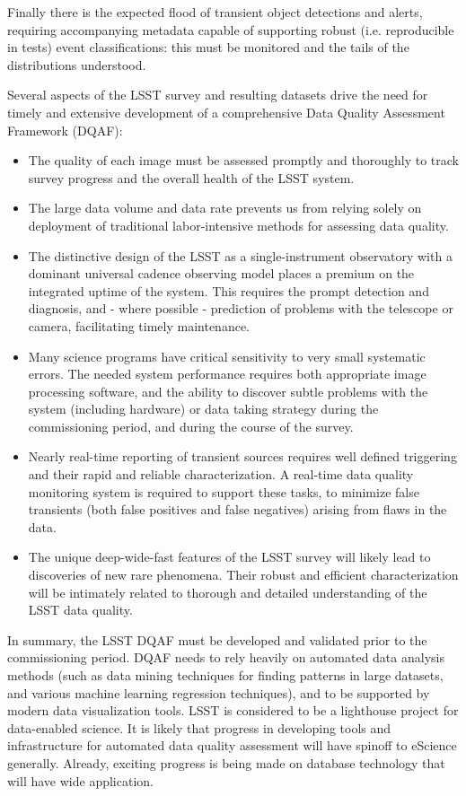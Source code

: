 \documentclass[SE,toc,lsstdraft]{lsstdoc}
\begin{document}
Finally there is the expected flood of transient object detections and alerts, requiring accompanying metadata capable of supporting robust (i.e. reproducible in tests) event classifications: this must be monitored and the tails of the distributions understood.

Several aspects of the LSST survey and resulting datasets drive the need for timely and
extensive development of a comprehensive Data Quality Assessment Framework (DQAF):
\begin{itemize}
\item The quality of each image must be assessed promptly and thoroughly to track
         survey progress and the overall health of the LSST system.
\item The large data volume and data rate prevents us from relying solely on deployment of traditional
         labor-intensive methods for assessing data quality.
\item The distinctive design of the LSST as a single-instrument observatory with a dominant universal cadence observing     model places a premium on the integrated uptime of the system.  This requires the prompt detection and diagnosis, and - where possible - prediction of problems with the telescope or camera, facilitating timely maintenance.
\item Many science programs have critical sensitivity to very small systematic errors. The needed system
          performance requires both appropriate image processing software, and the ability
          to discover subtle problems with the system (including hardware) or data taking strategy during the
         commissioning period, and during the course of the survey.
\item Nearly real-time reporting of transient sources requires well defined triggering and their
          rapid and reliable characterization. A real-time data quality monitoring system is required to
          support these tasks, to minimize false transients (both false positives and false negatives) arising from flaws in the data.
\item The unique deep-wide-fast features of the LSST survey will likely lead to discoveries of
          new rare phenomena.  Their robust and efficient characterization will be intimately
          related to thorough and detailed understanding of the LSST data quality.
\end{itemize}

In summary, the LSST DQAF must be developed and validated prior to the commissioning
period. DQAF needs to rely heavily on automated data analysis methods (such as data mining
techniques for finding patterns in large datasets, and various machine learning regression
techniques), and to be supported by modern data visualization tools. LSST is considered to be a lighthouse project for data-enabled science.  It is likely that progress in developing tools and infrastructure for automated data quality assessment will have spinoff to eScience generally. Already, exciting progress is being made on database technology that will have wide application.
\end{document}
